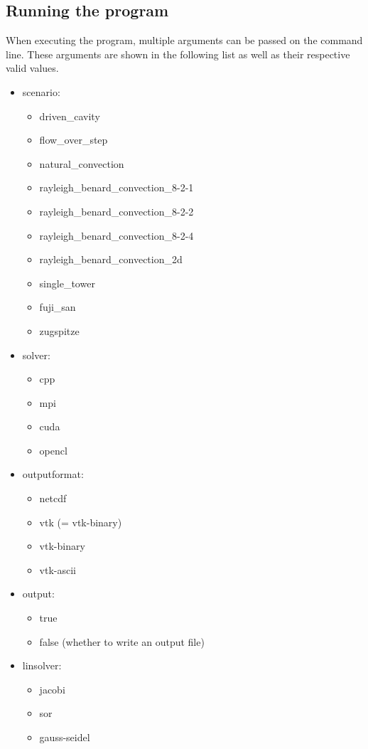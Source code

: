 \documentclass{article}%
\begin{document}
\subsection{Running the program}
When executing the program, multiple arguments can be passed on the command line. These arguments are shown in the following list as well as their respective valid values.
\begin{itemize}
\item scenario:
	\begin{itemize}
	\item driven\_cavity
	\item flow\_over\_step
	\item natural\_convection
	\item rayleigh\_benard\_convection\_8-2-1
	\item rayleigh\_benard\_convection\_8-2-2
	\item rayleigh\_benard\_convection\_8-2-4
	\item rayleigh\_benard\_convection\_2d
	\item single\_tower
	\item fuji\_san
	\item zugspitze
	\end{itemize}
\item solver:
	\begin{itemize}
	\item cpp
	\item mpi
	\item cuda
	\item opencl
	\end{itemize}
\item outputformat:
	\begin{itemize}
	\item netcdf
	\item vtk (= vtk-binary)
	\item vtk-binary
	\item vtk-ascii
	\end{itemize}
\item output:
	\begin{itemize}
	\item true
	\item false (whether to write an output file)
	\end{itemize}
\item linsolver:
	\begin{itemize}
	\item jacobi
	\item sor
	\item gauss-seidel

\end{itemize}
\end{itemize}
\end{document}
